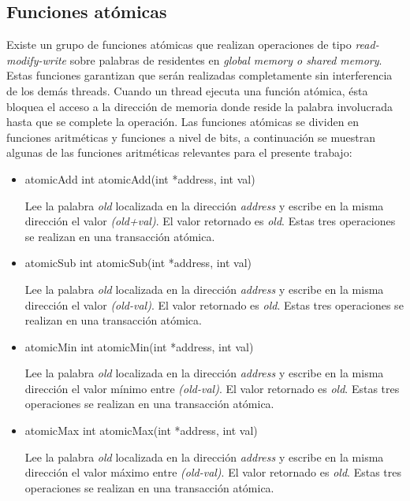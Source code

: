 \subsection*{Funciones atómicas}
Existe un grupo de funciones atómicas que realizan operaciones de tipo \textit{read-modify-write} sobre palabras de residentes en \textit{global memory o shared memory}. Estas funciones garantizan que serán realizadas completamente sin interferencia de los demás threads.
Cuando un thread ejecuta una función atómica, ésta bloquea el acceso a la dirección de memoria donde reside la palabra involucrada hasta que se complete la operación. Las funciones atómicas se dividen en funciones aritméticas y funciones a nivel de bits, a continuación se muestran algunas de las funciones aritméticas relevantes para el presente trabajo:

\begin{itemize}

	\item atomicAdd int atomicAdd(int *address, int val)

	Lee la palabra \textit{old} localizada en la dirección \textit{address} y escribe en la misma dirección el valor \textit{(old+val)}. El valor retornado es \textit{old}. Estas tres operaciones se realizan en una transacción atómica.

	\item atomicSub int atomicSub(int *address, int val)

	Lee la palabra \textit{old} localizada en la dirección \textit{address} y escribe en la misma dirección el valor \textit{(old-val)}. El valor retornado es \textit{old}. Estas tres operaciones se realizan en una transacción atómica.

	\item atomicMin int atomicMin(int *address, int val)

	Lee la palabra \textit{old} localizada en la dirección \textit{address} y escribe en la misma dirección el valor mínimo entre \textit{(old-val)}. El valor retornado es \textit{old}. Estas tres operaciones se realizan en una transacción atómica.

	 \item atomicMax int atomicMax(int *address, int val)

	Lee la palabra \textit{old} localizada en la dirección \textit{address} y escribe en la misma dirección el valor máximo entre \textit{(old-val)}. El valor retornado es \textit{old}. Estas tres operaciones se realizan en una transacción atómica.

\end{itemize}


